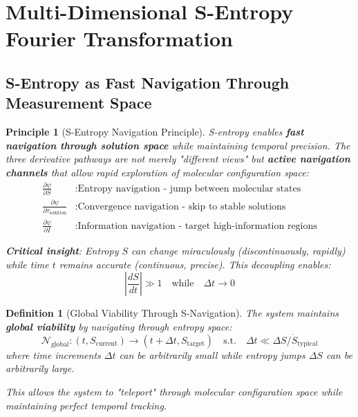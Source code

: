 \documentclass[12pt,a4paper]{article}
\newtheorem{definition}[theorem]{Definition}
\newtheorem{principle}[theorem]{Principle}
\begin{document}
\section{Multi-Dimensional S-Entropy Fourier Transformation}

\subsection{S-Entropy as Fast Navigation Through Measurement Space}

\begin{principle}[S-Entropy Navigation Principle]
S-entropy enables \textbf{fast navigation through solution space} while maintaining temporal precision. The three derivative pathways are not merely "different views" but \textbf{active navigation channels} that allow rapid exploration of molecular configuration space:
\begin{align}
\frac{\partial \psi}{\partial S} &: \text{Entropy navigation - jump between molecular states} \\
\frac{\partial \psi}{\partial \tau_{\text{solution}}} &: \text{Convergence navigation - skip to stable solutions} \\
\frac{\partial \psi}{\partial I} &: \text{Information navigation - target high-information regions}
\end{align}

\textbf{Critical insight}: Entropy $S$ can change \textit{miraculously} (discontinuously, rapidly) while time $t$ remains \textit{accurate} (continuous, precise). This decoupling enables:
\begin{equation}
\left|\frac{dS}{dt}\right| \gg 1 \quad \text{while} \quad \Delta t \to 0
\end{equation}
\end{principle}

\begin{definition}[Global Viability Through S-Navigation]
The system maintains \textbf{global viability} by navigating through entropy space:
\begin{equation}
\mathcal{N}_{\text{global}}: (t, S_{\text{current}}) \rightarrow (t + \Delta t, S_{\text{target}}) \quad \text{s.t.} \quad \Delta t \ll \Delta S/\dot{S}_{\text{typical}}
\end{equation}
where time increments $\Delta t$ can be arbitrarily small while entropy jumps $\Delta S$ can be arbitrarily large.

This allows the system to "teleport" through molecular configuration space while maintaining perfect temporal tracking.
\end{definition}
\end{document}
